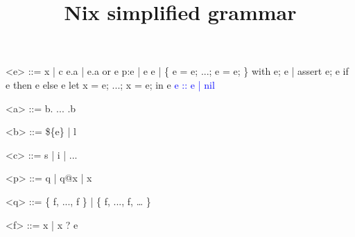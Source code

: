 \documentclass{article}
\title{Nix simplified grammar}
\date{}
\begin{document}
\maketitle{}

\begin{grammar}
<e> ::=
    x | c
  \alt e.a | e.a or e
  \alt p:e | e e
  \alt [ e ... e ] | \{ e = e; ...; e = e; \}
  \alt with e; e | assert e; e
  \alt if e then e else e
  \alt let x = e; ...; x = e; in e
  \textcolor{blue}{\alt e :: e | nil}

<a> ::= b. ... .b

<b> ::= \$\{e\} | l

<c> ::= s | i | ...

<p> ::= q | q@x | x

<q> ::= \{ f, ..., f \} | \{ f, ..., f, … \}

<f> ::= x | x ? e

\end{grammar}
\end{document}
